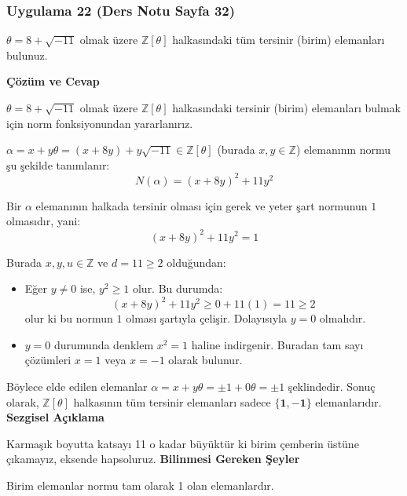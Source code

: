 \documentclass[11pt, a4paper]{article}
\newenvironment{cozum}{
    \vspace{0.5cm}
    \noindent\textcolor{green!60!black}{\faCheckCircle\enspace \textbf{\Large Çözüm ve Cevap}}\par\vspace{0.2cm}
}{}
\newenvironment{sezgisel}{
    \vspace{0.5cm}
    \noindent\textcolor{orange!80!black}{\faLightbulb\enspace \textbf{\Large Sezgisel Açıklama}}\par\vspace{0.2cm}
    \itshape
}{}
\newenvironment{bilgi}{
    \vspace{0.5cm}
    \noindent\textcolor{red!70!black}{\faExclamationTriangle\enspace \textbf{\Large Bilinmesi Gereken Şeyler}}\par\vspace{0.2cm}
}{}
\begin{document}
\subsubsection{Uygulama 22 (Ders Notu Sayfa 32)}
\begin{sorubox}
$\theta = 8 + \sqrt{-11}$ olmak üzere $\mathbb{Z}[\theta]$ halkasındaki tüm tersinir (birim) elemanları bulunuz.
\end{sorubox}
\begin{cozum}
$\theta = 8 + \sqrt{-11}$ olmak üzere $\mathbb{Z}[\theta]$ halkasındaki tersinir (birim) elemanları bulmak için norm fonksiyonundan yararlanırız.

$\alpha = x + y\theta = (x + 8y) + y\sqrt{-11} \in \mathbb{Z}[\theta]$ (burada $x, y \in \mathbb{Z}$) elemanının normu şu şekilde tanımlanır:
\[ N(\alpha) = (x + 8y)^2 + 11 y^2 \]

Bir $\alpha$ elemanının halkada tersinir olması için gerek ve yeter şart normunun $1$ olmasıdır, yani:
\[ (x + 8y)^2 + 11 y^2 = 1 \]

Burada $x, y, u \in \mathbb{Z}$ ve $d = 11 \ge 2$ olduğundan:
\begin{itemize}
    \item Eğer $y \neq 0$ ise, $y^2 \ge 1$ olur. Bu durumda:
    \[ (x + 8y)^2 + 11 y^2 \ge 0 + 11(1) = 11 \ge 2 \]
    olur ki bu normun $1$ olması şartıyla çelişir. Dolayısıyla $y = 0$ olmalıdır.
    \item $y = 0$ durumunda denklem $x^2 = 1$ haline indirgenir. Buradan tam sayı çözümleri $x = 1$ veya $x = -1$ olarak bulunur.
\end{itemize}

Böylece elde edilen elemanlar $\alpha = x + y\theta = \pm 1 + 0\theta = \pm 1$ şeklindedir. Sonuç olarak, $\mathbb{Z}[\theta]$ halkasının tüm tersinir elemanları sadece $\mathbf{\{1, -1\}}$ elemanlarıdır.
\end{cozum}
\begin{sezgisel}
Karmaşık boyutta katsayı 11 o kadar büyüktür ki birim çemberin üstüne çıkamayız, eksende hapsoluruz.
\end{sezgisel}
\begin{bilgi}
Birim elemanlar normu tam olarak 1 olan elemanlardır.
\end{bilgi}

\newpage
\end{document}
